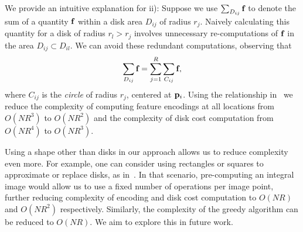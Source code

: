 \documentclass[10pt,twocolumn,letterpaper]{article}
\begin{document}
We provide an intuitive explanation for ii):
Suppose we use $\sum_{D_{ij}} \mathbf{f}_{}$ to denote the sum of a quantity $\mathbf{f}_{}$ within a disk area $D_{ij}$ of radius $r_j$.
Naively calculating this quantity for a disk of radius $r_l > r_j$ involves unnecessary re-computations of $\mathbf{f}_{}$
in the area $D_{ij} \subset D_{il}$.
We can avoid these redundant computations, observing that 
\begin{equation}
\sum_{D_{ij}} \mathbf{f}_{} = \sum_{j=1}^R \sum_{C_{ij}} \mathbf{f}_{}, \label{eq:circlesum}
\end{equation}
where $C_{ij}$ is the \emph{circle} of radius $r_j$, centered at $\mathbf{p}_{i}$.
Using the relationship in~ we reduce the complexity of computing feature encodings at all locations from
$O(NR^3)$ to $O(NR^2)$ and the complexity of disk cost computation from $O(NR^4)$ to $O(NR^3)$.

Using a shape other than disks in our approach allows us to reduce complexity even more.
For example, one can consider using rectangles or squares to approximate or replace disks, 
as in~\cite{arbelaez2011contour,tsogkas2012learning}.
In that scenario, pre-computing an integral image would allow us to use a fixed number of operations per image point, further
reducing complexity of encoding and disk cost computation to $O(NR)$ and $O(NR^2)$ respectively.
Similarly, the complexity of the greedy algorithm can be reduced to $O(NR)$.
We aim to explore this in future work.



\end{document}
